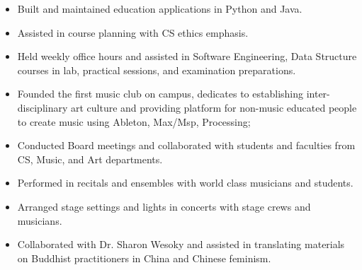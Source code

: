 \begin{itemize}
\item Built and maintained education applications in Python and Java.
\item Assisted in course planning with CS ethics emphasis.
\end{itemize}
\smallskip
{}
\begin{itemize}
\item Held weekly office hours and assisted in Software Engineering, Data Structure courses in lab, practical sessions, and examination preparations.
\end{itemize}
\smallskip
{}
\begin{itemize}
\item Founded the first music club on campus, dedicates to establishing inter-disciplinary art culture and providing platform for non-music educated people to create music using Ableton, Max/Msp, Processing;
\item Conducted Board meetings and collaborated with students and faculties from CS, Music, and Art departments.
\end{itemize}
\smallskip
{}
\begin{itemize}
\item Performed in recitals and ensembles with world class musicians and students.
\item Arranged stage settings and lights in concerts with stage crews and musicians.
\end{itemize}
\smallskip
{}
\begin{itemize}
\item Collaborated with Dr. Sharon Wesoky and assisted in translating materials on Buddhist practitioners in China and Chinese feminism.
\end{itemize}
\smallskip



